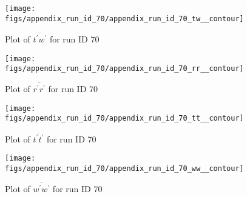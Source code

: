 \begin{figure}[H]
\centering
\texttt{[image: figs/appendix\_run\_id\_70/appendix\_run\_id\_70\_tw\_\_contour]}
\caption{Plot of $\overline{t^\prime w^\prime}$ for run ID 70}
\label{fig:appendix_run_id_70_tw__contour}
\end{figure}


\begin{figure}[H]
\centering
\texttt{[image: figs/appendix\_run\_id\_70/appendix\_run\_id\_70\_rr\_\_contour]}
\caption{Plot of $\overline{r^\prime r^\prime}$ for run ID 70}
\label{fig:appendix_run_id_70_rr__contour}
\end{figure}


\begin{figure}[H]
\centering
\texttt{[image: figs/appendix\_run\_id\_70/appendix\_run\_id\_70\_tt\_\_contour]}
\caption{Plot of $\overline{t^\prime t^\prime}$ for run ID 70}
\label{fig:appendix_run_id_70_tt__contour}
\end{figure}


\begin{figure}[H]
\centering
\texttt{[image: figs/appendix\_run\_id\_70/appendix\_run\_id\_70\_ww\_\_contour]}
\caption{Plot of $\overline{w^\prime w^\prime}$ for run ID 70}
\label{fig:appendix_run_id_70_ww__contour}
\end{figure}


